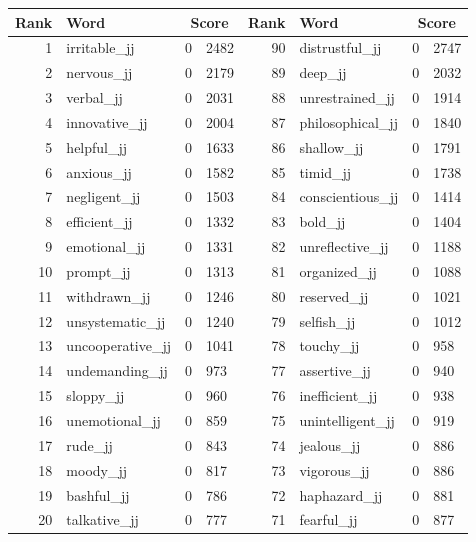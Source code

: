 \begin{table}[tbp]
    \begin{tabular}{| rlr@{.}l | rlr@{.}l |}
    \hline
    \textbf{Rank} & \textbf{Word} & \multicolumn{2}{c|}{\textbf{Score}} & \textbf{Rank} & \textbf{Word} & \multicolumn{2}{c|}{\textbf{Score}} \\
    \hline
    1 & irritable\_jj & 0 & 2482    &    90 & distrustful\_jj & 0 & 2747 \\
    2 & nervous\_jj & 0 & 2179    &    89 & deep\_jj & 0 & 2032 \\
    3 & verbal\_jj & 0 & 2031    &    88 & unrestrained\_jj & 0 & 1914 \\
    4 & innovative\_jj & 0 & 2004    &    87 & philosophical\_jj & 0 & 1840 \\
    5 & helpful\_jj & 0 & 1633    &    86 & shallow\_jj & 0 & 1791 \\
    6 & anxious\_jj & 0 & 1582    &    85 & timid\_jj & 0 & 1738 \\
    7 & negligent\_jj & 0 & 1503    &    84 & conscientious\_jj & 0 & 1414 \\
    8 & efficient\_jj & 0 & 1332    &    83 & bold\_jj & 0 & 1404 \\
    9 & emotional\_jj & 0 & 1331    &    82 & unreflective\_jj & 0 & 1188 \\
    10 & prompt\_jj & 0 & 1313    &    81 & organized\_jj & 0 & 1088 \\
    11 & withdrawn\_jj & 0 & 1246    &    80 & reserved\_jj & 0 & 1021 \\
    12 & unsystematic\_jj & 0 & 1240    &    79 & selfish\_jj & 0 & 1012 \\
    13 & uncooperative\_jj & 0 & 1041    &    78 & touchy\_jj & 0 & 958 \\
    14 & undemanding\_jj & 0 & 973    &    77 & assertive\_jj & 0 & 940 \\
    15 & sloppy\_jj & 0 & 960    &    76 & inefficient\_jj & 0 & 938 \\
    16 & unemotional\_jj & 0 & 859    &    75 & unintelligent\_jj & 0 & 919 \\
    17 & rude\_jj & 0 & 843    &    74 & jealous\_jj & 0 & 886 \\
    18 & moody\_jj & 0 & 817    &    73 & vigorous\_jj & 0 & 886 \\
    19 & bashful\_jj & 0 & 786    &    72 & haphazard\_jj & 0 & 881 \\
    20 & talkative\_jj & 0 & 777    &    71 & fearful\_jj & 0 & 877 \\

\end{tabular}
\end{table}
